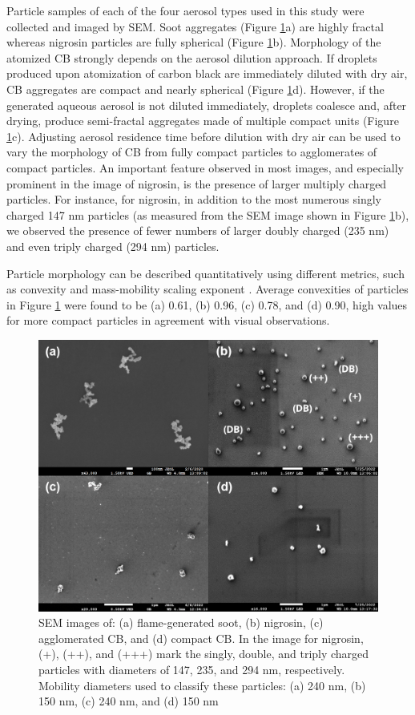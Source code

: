 Particle samples of each of the four aerosol types used in this study were collected and imaged by SEM. Soot aggregates (Figure \ref{fig:sem}a) are highly fractal whereas nigrosin particles are fully spherical (Figure \ref{fig:sem}b). Morphology of the atomized CB strongly depends on the aerosol dilution approach. If droplets produced upon atomization of carbon black are immediately diluted with dry air, CB aggregates are compact and nearly spherical (Figure \ref{fig:sem}d). However, if the generated aqueous aerosol is not diluted immediately, droplets coalesce and, after drying, produce semi-fractal aggregates made of multiple compact units (Figure \ref{fig:sem}c). Adjusting aerosol residence time before dilution with dry air can be used to vary the morphology of CB from fully compact particles to agglomerates of compact particles. An important feature observed in most images, and especially prominent in the image of nigrosin, is the presence of larger multiply charged particles. For instance, for nigrosin, in addition to the most numerous singly charged 147 nm particles (as measured from the SEM image shown in Figure \ref{fig:sem}b), we observed the presence of fewer numbers of larger doubly charged (235 nm) and even triply charged (294 nm) particles. 

Particle morphology can be described quantitatively using different metrics, such as convexity and mass-mobility scaling exponent \citep{RN69}. Average convexities of particles in Figure \ref{fig:sem} were found to be (a) 0.61, (b) 0.96, (c) 0.78, and (d) 0.90, high values for more compact particles in agreement with visual observations.

\begin{figure}[htp]
\centering
\includegraphics[width=\textwidth]{fig_sem.png}
\caption{SEM images of: (a) flame-generated soot, (b) nigrosin, (c) agglomerated CB, and (d) compact CB. In the image for nigrosin, (+), (++), and (+++) mark the singly, double, and triply charged particles with diameters of 147, 235, and 294 nm, respectively. Mobility diameters used to classify these particles: (a) 240 nm, (b) 150 nm, (c) 240 nm, and (d) 150 nm}
\label{fig:sem}
\end{figure}

